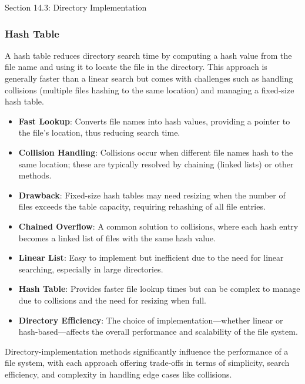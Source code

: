 \begin{notes}{Section 14.3: Directory Implementation}
\begin{highlight}
    \end{highlight}
    
    \subsubsection*{Hash Table}
    
    A hash table reduces directory search time by computing a hash value from the file name and using it to locate the file in the directory. This approach is generally faster than a linear search but 
    comes with challenges such as handling collisions (multiple files hashing to the same location) and managing a fixed-size hash table.
    
    \begin{highlight}
    
        \begin{itemize}
            \item \textbf{Fast Lookup}: Converts file names into hash values, providing a pointer to the file's location, thus reducing search time.
            \item \textbf{Collision Handling}: Collisions occur when different file names hash to the same location; these are typically resolved by chaining (linked lists) or other methods.
            \item \textbf{Drawback}: Fixed-size hash tables may need resizing when the number of files exceeds the table capacity, requiring rehashing of all file entries.
            \item \textbf{Chained Overflow}: A common solution to collisions, where each hash entry becomes a linked list of files with the same hash value.
        \end{itemize}
    
    \end{highlight}
    
    \begin{highlight}
    
        \begin{itemize}
            \item \textbf{Linear List}: Easy to implement but inefficient due to the need for linear searching, especially in large directories.
            \item \textbf{Hash Table}: Provides faster file lookup times but can be complex to manage due to collisions and the need for resizing when full.
            \item \textbf{Directory Efficiency}: The choice of implementation—whether linear or hash-based—affects the overall performance and scalability of the file system.
        \end{itemize}
    
    Directory-implementation methods significantly influence the performance of a file system, with each approach offering trade-offs in terms of simplicity, search efficiency, and complexity in handling 
    edge cases like collisions.
    
    \end{highlight}
\end{notes}


